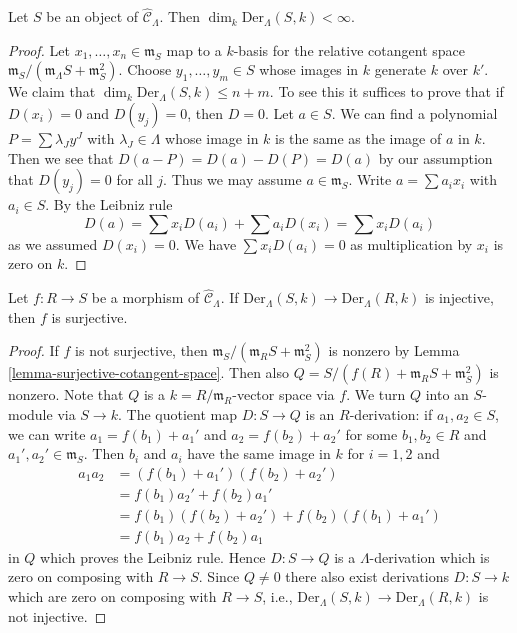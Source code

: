 \begin{lemma}
\label{lemma-derivations-finite}
Let $S$ be an object of $\widehat{\mathcal{C}}_\Lambda$.
Then $\dim_k \text{Der}_\Lambda(S, k) < \infty$.
\end{lemma}

\begin{proof}
Let $x_1, \ldots, x_n \in \mathfrak m_S$ map to a $k$-basis
for the relative cotangent space
$\mathfrak m_S/(\mathfrak m_\Lambda S + \mathfrak m_S^2)$.
Choose $y_1, \ldots, y_m \in S$ whose images in $k$ generate $k$
over $k'$. We claim that $\dim_k \text{Der}_\Lambda(S, k) \leq n + m$.
To see this it suffices to prove that if $D(x_i) = 0$ and
$D(y_j) = 0$, then $D = 0$. Let $a \in S$. We can find a
polynomial $P = \sum \lambda_J y^J$ with $\lambda_J \in \Lambda$
whose image in $k$ is the same as the image of $a$ in $k$.
Then we see that $D(a - P) = D(a) - D(P) = D(a)$ by our assumption
that $D(y_j) = 0$ for all $j$. Thus we may assume $a \in \mathfrak m_S$.
Write $a = \sum a_i x_i$ with $a_i \in S$. By the Leibniz rule
$$
D(a) = \sum x_iD(a_i) + \sum a_iD(x_i) = \sum x_iD(a_i)
$$
as we assumed $D(x_i) = 0$. We have $\sum x_iD(a_i) = 0$
as multiplication by $x_i$ is zero on $k$.
\end{proof}

\begin{lemma}
\label{lemma-derivations-surjective}
Let $f : R \to S$ be a morphism of $\widehat{\mathcal{C}}_\Lambda$.
If $\text{Der}_\Lambda(S, k) \to \text{Der}_\Lambda(R, k)$ is injective,
then $f$ is surjective.
\end{lemma}

\begin{proof}
If $f$ is not surjective, then
$\mathfrak m_S/(\mathfrak m_R S + \mathfrak m_S^2)$ is nonzero by
Lemma \ref{lemma-surjective-cotangent-space}.
Then also $Q = S/(f(R) + \mathfrak m_R S + \mathfrak m_S^2)$ is nonzero.
Note that $Q$ is a $k = R/\mathfrak m_R$-vector space via $f$. We turn
$Q$ into an $S$-module via $S \to k$. The quotient
map $D : S \to Q$ is an $R$-derivation: if $a_1, a_2 \in S$, we can write
$a_1 = f(b_1) + a_1'$ and $a_2 = f(b_2) + a_2'$ for some
$b_1, b_2 \in R$ and $a_1', a_2' \in \mathfrak m_S$. Then
$b_i$ and $a_i$ have the same image in $k$ for $i = 1, 2$ and
\begin{align*}
a_1a_2 & = (f(b_1) + a_1')(f(b_2) + a_2') \\
& = f(b_1)a_2' + f(b_2)a_1' \\
& = f(b_1)(f(b_2) + a_2') + f(b_2)(f(b_1) + a_1') \\
& = f(b_1)a_2 + f(b_2)a_1
\end{align*}
in $Q$ which proves the Leibniz rule. Hence $D : S \to Q$ is a
$\Lambda$-derivation which is zero on composing with $R \to S$.
Since $Q \not = 0$ there also exist derivations $D : S \to k$ which
are zero on composing with $R \to S$, i.e.,
$\text{Der}_\Lambda(S, k) \to \text{Der}_\Lambda(R, k)$ is not injective.
\end{proof}

